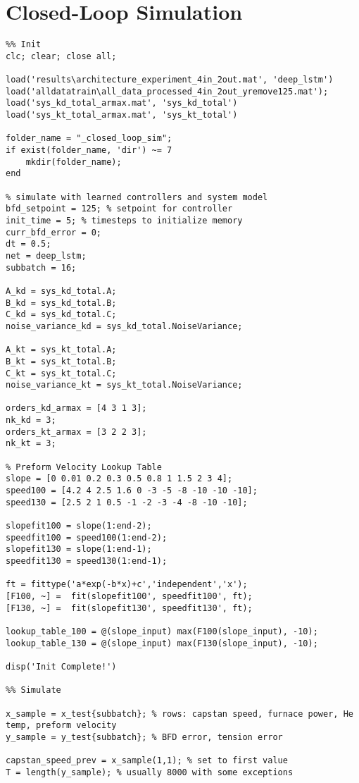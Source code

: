 \section{Closed-Loop Simulation} \label{apdx:code:sim}

\begin{lstlisting}
%% Init
clc; clear; close all; 

load('results\architecture_experiment_4in_2out.mat', 'deep_lstm')
load('alldatatrain\all_data_processed_4in_2out_yremove125.mat');
load('sys_kd_total_armax.mat', 'sys_kd_total')
load('sys_kt_total_armax.mat', 'sys_kt_total')

folder_name = "_closed_loop_sim";
if exist(folder_name, 'dir') ~= 7
    mkdir(folder_name);
end

% simulate with learned controllers and system model
bfd_setpoint = 125; % setpoint for controller
init_time = 5; % timesteps to initialize memory
curr_bfd_error = 0;
dt = 0.5;
net = deep_lstm;
subbatch = 16;

A_kd = sys_kd_total.A;
B_kd = sys_kd_total.B; 
C_kd = sys_kd_total.C;
noise_variance_kd = sys_kd_total.NoiseVariance;

A_kt = sys_kt_total.A;
B_kt = sys_kt_total.B; 
C_kt = sys_kt_total.C;
noise_variance_kt = sys_kt_total.NoiseVariance;

orders_kd_armax = [4 3 1 3];
nk_kd = 3;
orders_kt_armax = [3 2 2 3];
nk_kt = 3;

% Preform Velocity Lookup Table
slope = [0 0.01 0.2 0.3 0.5 0.8 1 1.5 2 3 4];
speed100 = [4.2 4 2.5 1.6 0 -3 -5 -8 -10 -10 -10];
speed130 = [2.5 2 1 0.5 -1 -2 -3 -4 -8 -10 -10];

slopefit100 = slope(1:end-2);
speedfit100 = speed100(1:end-2);
slopefit130 = slope(1:end-1);
speedfit130 = speed130(1:end-1);

ft = fittype('a*exp(-b*x)+c','independent','x');
[F100, ~] =  fit(slopefit100', speedfit100', ft);
[F130, ~] =  fit(slopefit130', speedfit130', ft);

lookup_table_100 = @(slope_input) max(F100(slope_input), -10);
lookup_table_130 = @(slope_input) max(F130(slope_input), -10);

disp('Init Complete!')

%% Simulate

x_sample = x_test{subbatch}; % rows: capstan speed, furnace power, He temp, preform velocity
y_sample = y_test{subbatch}; % BFD error, tension error

capstan_speed_prev = x_sample(1,1); % set to first value
T = length(y_sample); % usually 8000 with some exceptions


\end{lstlisting}
